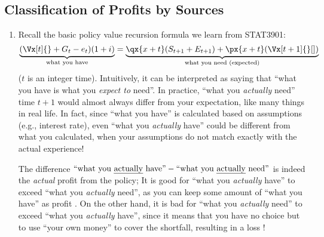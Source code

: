 \subsection{Classification of Profits by Sources}
\label{subsect:classify-profits}
\begin{enumerate}
\item Recall the basic policy value recursion formula we learn from STAT3901:
\[
\underbrace{(\Vx[t]{}+G_t-e_t)(1+i)}_{\text{what you have}}=
\underbrace{\qx{x+t}(S_{t+1}+E_{t+1})+\px{x+t}(\Vx[t+1]{}[])}_{\text{what you need (expected)}}
\]
(\(t\) is an integer time). Intuitively, it can be interpreted as saying that
``what you have is what you \emph{expect to} need''. In practice, ``what
you \emph{actually} need''  time \(t+1\) would almost always
differ from your expectation, like many things in real life. In fact, since
``what you have'' is calculated based on assumptions (e.g., interest rate),
even ``what you \emph{actually} have'' could be different from what you
calculated, when your assumptions do not match exactly with the actual
experience!

The difference \(\text{``what you \emph{actually} have''}-\text{``what you
\emph{actually} need''}\) is indeed the \emph{actual} profit from
the policy; It is good  for ``what you
\emph{actually} have'' to exceed ``what you \emph{actually} need'',
as you can keep some amount of ``what you have'' as profit
.  On the other hand, it is bad
 for ``what you \emph{actually} need'' to
exceed ``what you \emph{actually} have'', since it means that you have no
choice but to use ``your own money'' to cover the shortfall, resulting in a
loss !


\end{enumerate}
